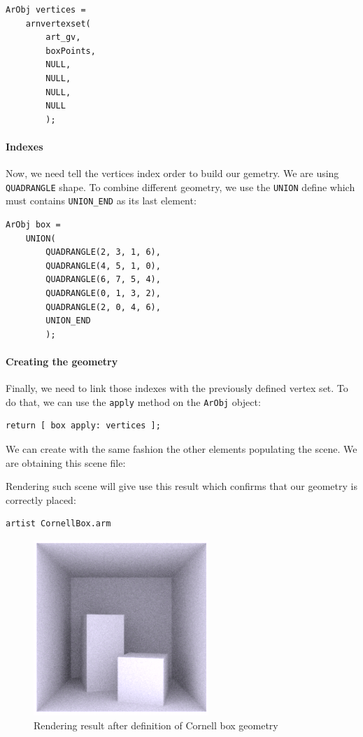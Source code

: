 \documentclass[a4paper,chapterprefix]{scrbook}
\begin{document}
\begin{lstlisting}
ArObj vertices = 
    arnvertexset(
        art_gv,
        boxPoints,
        NULL,
        NULL,
        NULL,
        NULL
        );
\end{lstlisting}

\paragraph{Indexes}
Now, we need tell the vertices index order to build our gemetry. We are using \verb?QUADRANGLE? shape. To combine different geometry, we use the \verb?UNION? define which must contains \verb?UNION_END? as its last element:

\begin{lstlisting}
ArObj box =
    UNION(
        QUADRANGLE(2, 3, 1, 6),
        QUADRANGLE(4, 5, 1, 0),
        QUADRANGLE(6, 7, 5, 4),
        QUADRANGLE(0, 1, 3, 2),
        QUADRANGLE(2, 0, 4, 6),
        UNION_END
        );
\end{lstlisting}

\paragraph{Creating the geometry}
Finally, we need to link those indexes with the previously defined vertex set. To do that, we can use the \verb?apply? method on the \verb?ArObj? object:

\begin{lstlisting}
return [ box apply: vertices ];
\end{lstlisting}

We can create with the same fashion the other elements populating the scene. We are obtaining this scene file:



Rendering such scene will give use this result which confirms that our geometry is correctly placed:

\begin{verbatim}
artist CornellBox.arm
\end{verbatim}

\begin{figure}[h]
	\centering
	\includegraphics[width=0.2\linewidth]{Example_Scene/CornellBox_step1.png}
	\caption{Rendering result after definition of Cornell box geometry}
\end{figure}
\end{document}
